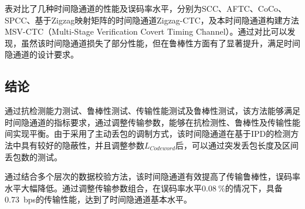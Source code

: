 
表对比了几种时间隐通道的性能及误码率水平，分别为SCC、AFTC、CoCo、SPCC、基于Zigzag映射矩阵的时间隐通道Zigzag-CTC，及本时间隐通道构建方法MSV-CTC（Multi-Stage Verification Covert Timing Channel）。通过对比可以发现，虽然该时间隐通道损失了部分性能，但在鲁棒性方面有了显著提升，满足时间隐通道的设计要求。

\subsection{结论}
\label{chap:hash:result:conclusion}

通过抗检测能力测试、鲁棒性测试、传输性能测试及鲁棒性测试，该方法能够满足时间隐通道的指标要求，通过调整传输参数，能够在抗检测性、鲁棒性及传输性能间实现平衡。由于采用了主动丢包的调制方式，该时间隐通道在基于IPD的检测方法中具有较好的隐蔽性，并且调整参数$L_{Codeword}$后，可以通过突发丢包长度及区间丢包数的测试。

通过结合多个层次的数据校验方法，该时间隐通道有效提高了传输鲁棒性，误码率水平大幅降低。通过调整传输参数组合，在误码率水平$0.08\ \%$的情况下，具备0.73\ bps的传输性能，达到了时间隐通道基本水平。